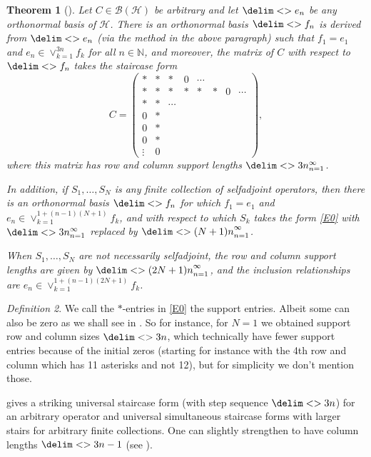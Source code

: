 \documentclass[10pt,reqno]{amsart}
\newtheorem{theorem}{Theorem}[section]
\theoremstyle{remark}
\newtheorem{definition}[theorem]{Definition}
\newcommand{\BH}{\mathcal{B}(\Hil)}
\newcommand{\Hil}{\mathcal{H}}
\newcommand{\seq}{\delim<>}
\numberwithin{equation}{section}
\begin{document}
\begin{theorem}[]
  \label{t1}
  Let $C \in \BH$ be arbitrary and let $\seq{e_n}$ be any orthonormal basis of $\Hil$.
  There is an orthonormal basis $\seq{f_n}$ is derived from $\seq{e_n}$ (via the method in the above paragraph) such that $f_1 = e_1$ and $e_n \in \vee_{k=1}^{3n} f_k$ for all $n \in \mathbb{N}$, and moreover, the matrix of $C$ with respect to $\seq{f_n}$ takes the staircase form
  \begin{equation}
    \label{E0}
    C =
    \begin{pmatrix}
      *&*&*&0&\cdots\\
      *&*&*&*&*&*&0& \cdots\\
      *&*&\cdots\\
      0&*&\\
      0&*&\\
      0&*&\\
      \vdots&0&
    \end{pmatrix},
  \end{equation}
  where this matrix has row and column support lengths $\seq{3n}_{n=1}^{\infty}$.

  In addition, if $S_1, \ldots, S_N$ is any finite collection of selfadjoint operators, then there is an orthonormal basis $\seq{f_n}$ for which $f_1 = e_1$ and $e_n\in\vee_{k=1}^{1+(n-1)(N+1)} f_k$, and with respect to which $S_k$ takes the form \eqref{E0}  with $\seq{3n}_{n=1}^{\infty}$ replaced by $\seq{(N+1)n}_{n=1}^{\infty}$.
  
  When $S_1, \ldots, S_N$ are not necessarily selfadjoint, the row and column support lengths are given by $\seq{(2N+1)n}_{n=1}^{\infty}$, and the inclusion relationships are $e_n\in\vee_{k=1}^{1+(n-1)(2N+1)} f_k$.
\end{theorem}

\begin{definition}
  \label{def4.2}
  We call the $*$-entries in \eqref{E0} the support entries.
  Albeit some can also be zero as we shall see in .
  So for instance, for $N=1$ we obtained support row and column sizes $\seq{3n}$, which technically have fewer support entries because of the initial zeros (starting for instance with the 4th row and column which has 11 asterisks and not 12), but for simplicity we don't mention those.
\end{definition}



 gives a striking universal staircase form (with step sequence $\seq{3n}$) for an arbitrary operator and universal simultaneous staircase forms with larger stairs for arbitrary finite collections.
One can slightly strengthen  to have column lengths $\seq{3n-1}$ (see \cite[Remark 20.3]{PPW-2020-TmloVLOt}).
\end{document}
